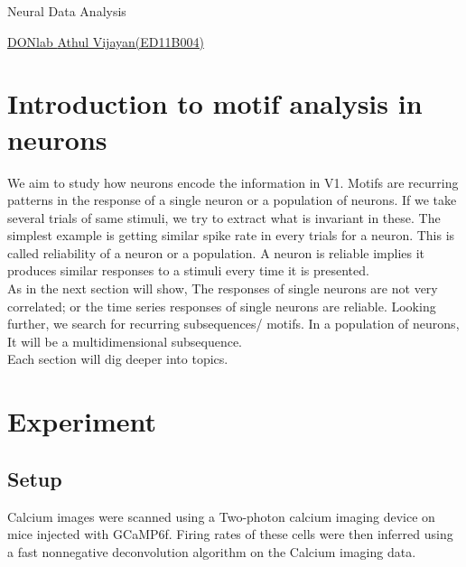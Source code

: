 \documentclass[11pt,paper=a4,answers]{exam}
\begin{document}
\noindent
\begin{minipage}[l]{.1\textwidth}%
\noindent
\end{minipage}
\hfill
\begin{minipage}[r]{.68\textwidth}%
\begin{center}
{\large \bfseries \par
\Large Neural Data Analysis \\[2pt]
\vspace{6pt}
\small   \par}
\end{center}
\end{minipage}
\begin{minipage}[l]{.195\textwidth}%
\noindent
{\footnotesize}
\end{minipage}
\par
\noindent
\uline{DONlab \hfill \normalsize\emph \hfill    Athul Vijayan(ED11B004)}\\

\tableofcontents
\newpage
\section{Introduction to motif analysis in neurons} %
\label{sec:introduction}
We aim to study how neurons encode the information in V1. Motifs are recurring patterns in the response of a single neuron or a population of neurons. If we take several trials of same stimuli, we try to extract what is invariant in these. The simplest example is getting similar spike rate in every trials for a neuron. This is called reliability of a neuron or a population. A neuron is reliable implies it produces similar responses to a stimuli every time it is presented.\\
As in the next section will show, The responses of single neurons are not very correlated; or the time series responses of single neurons are reliable. Looking further, we search for recurring subsequences/ motifs. In a population of neurons, It will be a multidimensional subsequence.\\
Each section will dig deeper into topics.

\section{Experiment} %
\label{sec:experiment}
\subsection{Setup} %
\label{sub:setup}
Calcium images were scanned using a Two-photon calcium imaging device on mice injected with GCaMP6f. Firing rates of these cells were then inferred using a fast nonnegative deconvolution algorithm on the Calcium imaging data.\\
\end{document}
